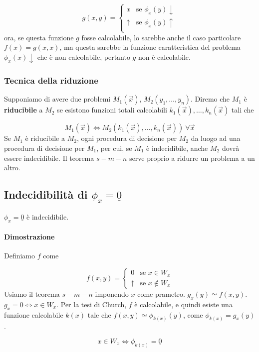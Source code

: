$$
g(x,y)
= \begin{cases}
	x &\text{se $\phi_x(y)\downarrow$}\\
	\uparrow &\text{se $\phi_x(y)\uparrow$}\\
\end{cases}
$$
%
ora, se questa funzione $g$ fosse calcolabile, lo sarebbe anche il caso particolare $f(x) = g(x,x)$, ma questa sarebbe la funzione caratteristica del problema $\phi_x(x)\downarrow$ che è non calcolabile, pertanto $g$ non è calcolabile.

\subsubsection{Tecnica della riduzione}
Supponiamo di avere due problemi $M_1(\vec{x}),\, M_2(y_1, \dots, y_n)$. Diremo che $M_1$ è \textbf{riducibile} a $M_2$ se esistono funzioni totali calcolabili $k_1(\vec{x}), \dots, k_n(\vec{x})$ tali che 

$$
M_1(\vec{x}) \Leftrightarrow M_2(k_1(\vec{x}), \dots, k_n(\vec{x})) \ \forall \vec{x}
$$
%
Se $M_1$ è riducibile a $M_2$, ogni procedura di decisione per $M_2$ da luogo ad una procedura di decisione per $M_1$, per cui, se $M_1$ è indecidibile, anche $M_2$ dovrà essere indecidibile. Il teorema $s-m-n$ serve proprio a ridurre un problema a un altro.

\subsection{Indecidibilità di $\phi_x = \underline0$}
 $\phi_x = \underline0$ è indecidibile.
 
 \paragraph{Dimostrazione}
 Definiamo $f$ come 
 
 $$
 f(x,y) = \begin{cases}
 0 &\text{se $x \in W_x$}\\
 \uparrow &\text{se $x \notin W_x$}
 \end{cases}
 $$
 Usiamo il teorema $s-m-n$ imponendo $x$ come prametro. $g_x(y) \simeq f(x,y)$. $g_x = \underline0 \Leftrightarrow x \in W_x$. Per la tesi di Church, $f$ è calcolabile, e quindi esiste una funzione calcolabile $k(x)$ tale che $f(x,y) \simeq \phi_{k(x)}(y)$, come $\phi_{k(x)} = g_x(y)$.
 
$$
x \in W_x \Leftrightarrow \phi_{k(x)} = \underline0
$$

